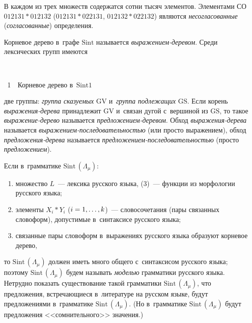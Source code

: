 \begin{multicols}{2}
    В каждом из трех множеств содержатся сотни тысяч элементов. 
Элементами СО $012131*012132$ ($012131*022131$, $012132*022132$) 
являются \textit{несогласованные} (\textit{согласованные}) определения.
    
    Корневое дерево в~графе $\mathrm{Sint}$ называется \textit{вы\-ра\-же\-ни\-ем-де\-ре\-вом}. 
Среди лексических групп имеются\linebreak\vspace*{-12pt}

{ \begin{center}  %
 \vspace*{-1pt}
   
 \mbox{%
 \epsfxsize=79.057mm 
 }


\vspace*{6pt}


\noindent
{{\figurename~1}\ \ \small{Корневое дерево в~$\mathrm{Sint1}$}}
\end{center}
}

\vspace*{12pt}

\addtocounter{figure}{1}

\noindent
 две группы: \textit{группа сказуемых} 
$\mathrm{GV}$ и~\textit{группа подлежащих} $\mathrm{GS}$. Если корень \textit{вы\-ра\-же\-ния-де\-ре\-ва} 
принадлежит $\mathrm{GV}$ и~связан дугой с~вершиной из $\mathrm{GS}$, то такое 
\textit{вы\-ра\-же\-ние-де\-ре\-во} называется  
\textit{пред\-ложением-де\-ре\-вом}. Обход  
\textit{вы\-ра\-же\-ния-де\-ре\-ва} называется  
\textit{вы\-ра\-же\-ни\-ем-по\-сле\-до\-ва\-тель\-ностью} (или прос\-то 
выражением), обход \textit{пред\-ло\-же\-ния-де\-ре\-ва} называется\linebreak  
\textit{пред\-ло\-же\-ни\-ем-по\-сле\-до\-ва\-тель\-ностью} (просто 
\textit{предложением}).
    
    Если в~грамматике $\mathrm{Sint}\,(\Lambda_\mu)$:
    \begin{enumerate}[(1)]
\item множество $L$~--- лексика русского языка, (3)~--- функции из 
морфологии русского языка; 
\item элементы ${X}_i*{Y}_i$ ($i \hm= 1,\ldots , k$)~--- 
словосочетания (пары связанных словоформ), допустимые в~синтаксисе 
русского языка; 
\item связанные пары словоформ в~выражениях русского языка образуют 
корневое дерево, 
\end{enumerate}
то $\mathrm{Sint}\,(\Lambda_\mu)$ должен иметь много общего с~синтаксисом русского 
языка; поэтому $\mathrm{Sint}\,(\Lambda_\mu)$ будем называть \textit{моделью} 
грамматики русского языка. Нетрудно показать существование такой 
грамматики $\mathrm{Sint}\,(\Lambda_\mu)$, что предложения, встречающиеся 
в~литературе на русском языке, будут предложениями в~грамматике 
$\mathrm{Sint}\,(\Lambda_\mu)$. (Но в~грамматике $\mathrm{Sint}\,(\Lambda_\mu)$ будут 
предложения <<сомнительного>> значения.)


\end{multicols}
